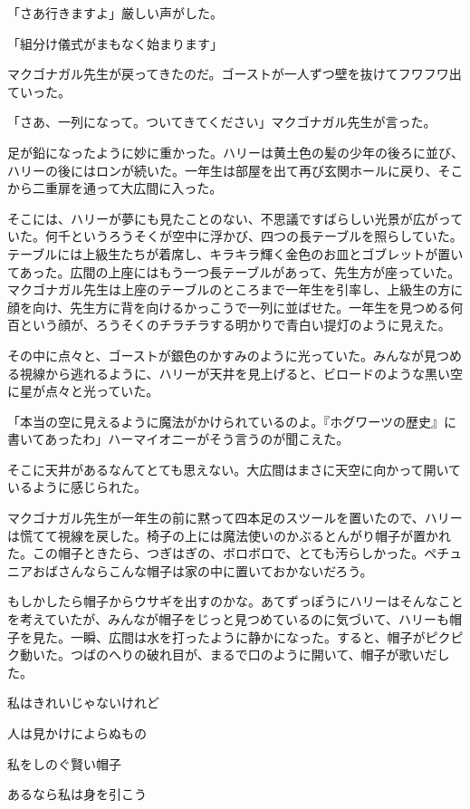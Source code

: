 \documentclass[10pt,a4paper]{article}
\begin{document}
\begin{CJK}{UTF8}{min}
「さあ行きますよ」厳しい声がした。

「組分け儀式がまもなく始まります」

マクゴナガル先生が戻ってきたのだ。ゴーストが一人ずつ壁を抜けてフワフワ出ていった。

「さあ、一列になって。ついてきてください」マクゴナガル先生が言った。

足が鉛になったように妙に重かった。ハリーは黄土色の髪の少年の後ろに並び、ハリーの後にはロンが続いた。一年生は部屋を出て再び玄関ホールに戻り、そこから二重扉を通って大広間に入った。

そこには、ハリーが夢にも見たことのない、不思議ですばらしい光景が広がっていた。何千というろうそくが空中に浮かび、四つの長テーブルを照らしていた。テーブルには上級生たちが着席し、キラキラ輝く金色のお皿とゴブレットが置いてあった。広間の上座にはもう一つ長テーブルがあって、先生方が座っていた。マクゴナガル先生は上座のテーブルのところまで一年生を引率し、上級生の方に顔を向け、先生方に背を向けるかっこうで一列に並ばせた。一年生を見つめる何百という顔が、ろうそくのチラチラする明かりで青白い提灯のように見えた。

その中に点々と、ゴーストが銀色のかすみのように光っていた。みんなが見つめる視線から逃れるように、ハリーが天井を見上げると、ビロードのような黒い空に星が点々と光っていた。

「本当の空に見えるように魔法がかけられているのよ。『ホグワーツの歴史』に書いてあったわ」ハーマイオニーがそう言うのが聞こえた。

そこに天井があるなんてとても思えない。大広間はまさに天空に向かって開いているように感じられた。

マクゴナガル先生が一年生の前に黙って四本足のスツールを置いたので、ハリーは慌てて視線を戻した。椅子の上には魔法使いのかぶるとんがり帽子が置かれた。この帽子ときたら、つぎはぎの、ボロボロで、とても汚らしかった。ペチュニアおばさんならこんな帽子は家の中に置いておかないだろう。

もしかしたら帽子からウサギを出すのかな。あてずっぽうにハリーはそんなことを考えていたが、みんなが帽子をじっと見つめているのに気づいて、ハリーも帽子を見た。一瞬、広間は水を打ったように静かになった。すると、帽子がピクピク動いた。つばのへりの破れ目が、まるで口のように開いて、帽子が歌いだした。





私はきれいじゃないけれど

人は見かけによらぬもの

私をしのぐ賢い帽子

あるなら私は身を引こう


\end{CJK}
\end{document}
